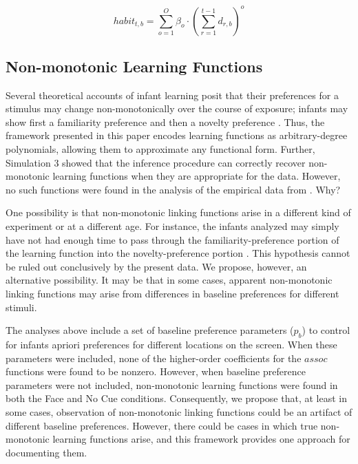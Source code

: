 \documentclass[12pt]{article}
\begin{document}
\begin{equation}\label{eq:habit}
habit_{t,b} = \sum_{o=1}^{O} \beta_{o} \cdot \left( \sum_{r=1}^{t-1} d_{r,b}\right) ^o
\end{equation}
	  	
\subsection*{Non-monotonic Learning Functions}

	Several theoretical accounts of infant learning posit that their preferences for a stimulus may change non-monotonically over the course of exposure; infants may show first a familiarity preference and then a novelty preference \cite{Hunter1988, Roder2000, Cohen2004}. Thus, the framework presented in this paper encodes learning functions as arbitrary-degree polynomials, allowing them to approximate any functional form. Further, Simulation 3 showed that the inference procedure can correctly recover non-monotonic learning functions when they are appropriate for the data. However, no such functions were found in the analysis of the empirical data from \cite{Wu2010a}. Why? 

	One possibility is that non-monotonic linking functions arise in a different kind of experiment or at a different age. For instance, the infants analyzed may simply have not had enough time to pass through the familiarity-preference portion of the learning function into the novelty-preference portion \cite{Hunter1988}. This hypothesis cannot be ruled out conclusively by the present data. We propose, however, an alternative possibility. It may be that in some cases, apparent non-monotonic linking functions may arise from differences in baseline preferences for different stimuli.

	The analyses above include a set of baseline preference parameters ($p_{b}$) to control for infants apriori preferences for different locations on the screen. When these parameters were included, none of the higher-order coefficients for the $assoc$ functions were found to be nonzero. However, when baseline preference parameters were not included, non-monotonic learning functions were found in both the Face and No Cue conditions. Consequently, we propose that, at least in some cases, observation of non-monotonic linking functions could be an artifact of different baseline preferences. However, there could be cases in which true non-monotonic learning functions arise, and this framework provides one approach for documenting them.
\end{document}
